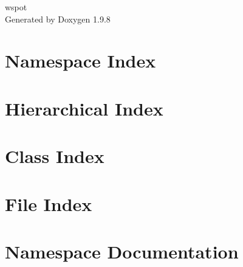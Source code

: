 \documentclass[twoside]{book}
\newcommand{\+}{\discretionary{\mbox{\scriptsize$\hookleftarrow$}}{}{}}
\newcommand{\clearemptydoublepage}{%
    \newpage{\pagestyle{empty}\cleardoublepage}%
  }
\begin{document}
  \raggedbottom
    \hypersetup{pageanchor=false,
                bookmarksnumbered=true,
                pdfencoding=unicode
               }
  \begin{titlepage}
  \vspace*{7cm}
  \begin{center}%
  {\Large wspot}\\
  \vspace*{1cm}
  {\large Generated by Doxygen 1.9.8}\\
  \end{center}
  \end{titlepage}
  \clearemptydoublepage
  \tableofcontents
  \clearemptydoublepage
  \hypersetup{pageanchor=true}
\chapter{Namespace Index}

\chapter{Hierarchical Index}

\chapter{Class Index}

\chapter{File Index}

\chapter{Namespace Documentation}






























\end{document}
